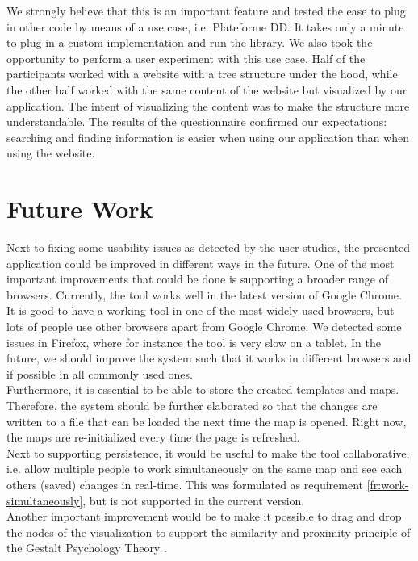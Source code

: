 We strongly believe that this is an important feature and tested the ease to plug in other code by means of a use case, i.e. Plateforme DD. It takes only a minute to plug in a custom implementation and run the library. We also took the opportunity to perform a user experiment with this use case. Half of the participants worked with a website with a tree structure under the hood, while the other half worked with the same content of the website but visualized by our application. The intent of visualizing the content was to make the structure more understandable. The results of the questionnaire confirmed our expectations: searching and finding information is easier when using our application than when using the website.


\section{Future Work}\label{sec:future-work}

Next to fixing some usability issues as detected by the user studies, the presented application could be improved in different ways in the future. One of the most important improvements that could be done is supporting a broader range of browsers. Currently, the tool works well in the latest version of Google Chrome. It is good to have a working tool in one of the most widely used browsers, but lots of people use other browsers apart from Google Chrome. We detected some issues in Firefox, where for instance the tool is very slow on a tablet. In the future, we should improve the system such that it works in different browsers and if possible in all commonly used ones.\\

Furthermore, it is essential to be able to store the created templates and maps. Therefore, the system should be further elaborated so that the changes are written to a file that can be loaded the next time the map is opened. Right now, the maps are re-initialized every time the page is refreshed.\\

Next to supporting persistence, it would be useful to make the tool collaborative, i.e. allow multiple people to work simultaneously on the same map and see each others (saved) changes in real-time. This was formulated as requirement \ref{fr:work-simultaneously}, but is not supported in the current version.\\

Another important improvement would be to make it possible to drag and drop the nodes of the visualization to support the similarity and proximity principle of the Gestalt Psychology Theory \citep{koffka2013principles}.\\
